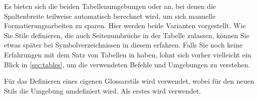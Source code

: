 \documentclass[%
  english,ngerman,%
  geometry=no,DIV=12,automark,%
]{tudscrartcl}
\begin{document}
Es bieten sich die beiden Tabellenumgebungen  oder 
 an, bei denen die Spaltenbreite teilweise automatisch 
berechnet wird, um sich manuelle Formatierungsarbeiten zu sparen. Hier werden 
beide Varianten vorgestellt. Wie Sie Stile definieren, die auch Seitenumbrüche 
in der Tabelle zulassen, können Sie etwas später bei Symbolverzeichnissen in 
diesem  erfahren. Falls Sie noch keine Erfahrungen 
mit dem Satz von Tabellen in  haben, lohnt sich vorher vielleicht 
ein Blick in \autoref{sec:tables}, um die verwendeten Befehle und Umgebungen zu 
verstehen.

Für das Definieren eines eigenen Glossarstils wird  
verwendet, wobei für den neuen Stils die Umgebung  
umdefiniert wird. Als erstes wird  verwendet. 
\end{document}
